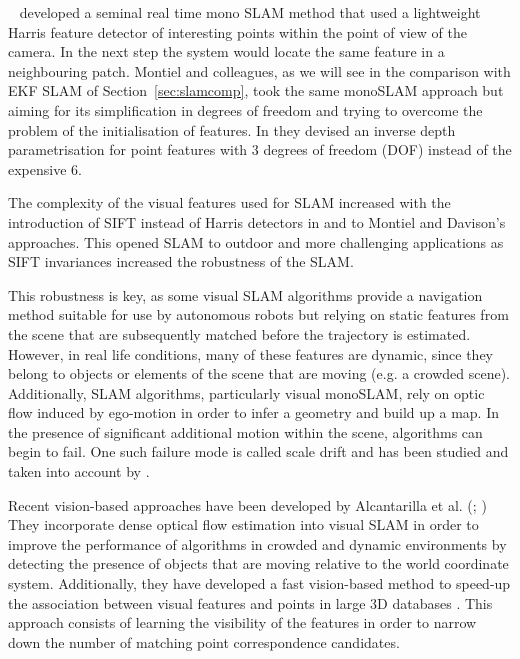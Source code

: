 
\citeauthor{davison2007monoslam}~\cite{davison2007monoslam} developed a seminal real time mono SLAM method that used a lightweight Harris feature detector of interesting points within the point of view of the camera. In the next step the system would locate the same feature in a neighbouring patch. Montiel and colleagues, as we will see in the comparison with EKF SLAM of Section~\ref{sec:slamcomp}, took the same monoSLAM approach but aiming for its simplification in degrees of freedom and trying to overcome the problem of the initialisation of features. In \citep{montiel2006unified} they devised an inverse depth parametrisation for point features with 3 degrees of freedom (DOF) instead of the expensive 6.

The complexity of the visual features used for SLAM increased with the introduction of SIFT instead of Harris detectors in \citep{chen2007sift} and \citep{suzuki2011development} to Montiel and Davison's approaches. This opened SLAM to outdoor and more challenging applications as SIFT invariances increased the robustness of the SLAM.

This robustness is key, as some visual SLAM algorithms provide a navigation method suitable for use by autonomous robots \citep{konolige2007frame} but relying on static features from the scene that are subsequently matched before the trajectory is estimated. However, in real life conditions, many of these features are dynamic, since they belong to objects or elements of the scene that are moving (e.g. a crowded scene). Additionally, SLAM algorithms, particularly visual monoSLAM, rely on optic flow induced by ego-motion in order to infer a geometry and build up a map. In the presence of significant additional motion within the scene, algorithms can begin to fail.  One such failure mode is called scale drift and has been studied and taken into account by \cite{strasdat2010scale}. 

Recent vision-based approaches have been developed by Alcantarilla et al. (\citeyear{alcantarilla2010visual}; \citeyear{alcantarilla2012combining}) They incorporate dense optical flow estimation into visual SLAM in order to improve the performance of algorithms in crowded and dynamic environments by detecting the presence of objects that are moving relative to the world coordinate system. Additionally, they have developed a fast vision-based method to speed-up the association between visual features and points in large 3D databases \citep{alcantarilla2010learning}. This approach consists of learning the visibility of the features in order to narrow down the number of matching point correspondence candidates.

